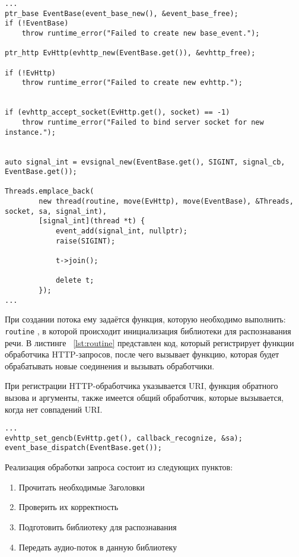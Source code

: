 \begin{lstlisting}[caption={Пример создания нескольких потоков обслуживания}, label={lst:ev:thread}]
...
ptr_base EventBase(event_base_new(), &event_base_free);
if (!EventBase)
    throw runtime_error("Failed to create new base_event.");

ptr_http EvHttp(evhttp_new(EventBase.get()), &evhttp_free);

if (!EvHttp)
    throw runtime_error("Failed to create new evhttp.");


if (evhttp_accept_socket(EvHttp.get(), socket) == -1)
    throw runtime_error("Failed to bind server socket for new instance.");


auto signal_int = evsignal_new(EventBase.get(), SIGINT, signal_cb, EventBase.get());

Threads.emplace_back(
        new thread(routine, move(EvHttp), move(EventBase), &Threads, socket, sa, signal_int),
        [signal_int](thread *t) {
            event_add(signal_int, nullptr);
            raise(SIGINT);

            t->join();

            delete t;
        });
...
\end{lstlisting}

При создании потока ему задаётся функция, которую необходимо выполнить: \texttt{routine}
, в которой происходит инициализация библиотеки для распознавания речи. В листинге~
\ref{lst:routine} представлен код, который регистрирует функции обработчика HTTP-запросов,
после чего вызывает функцию, которая будет обрабатывать новые соединения и вызывать
обработчики.

При регистрации HTTP-обработчика указывается URI, функция обратного вызова и аргументы,
также имеется общий обработчик, которые вызывается, когда нет совпадений URI.

\begin{lstlisting}[caption={Инициализация обработчиков}, label={lst:routine}]
...
evhttp_set_gencb(EvHttp.get(), callback_recognize, &sa);
event_base_dispatch(EventBase.get());
\end{lstlisting}

Реализация обработки запроса состоит из следующих пунктов:
\begin{enumerate}
    \item Прочитать необходимые Заголовки
    \item Проверить их корректность
    \item Подготовить библиотеку для распознавания
    \item Передать аудио-поток в данную библиотеку
\end{enumerate}

